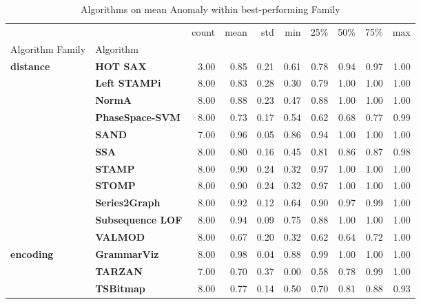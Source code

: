 \begin{table}
\caption{Algorithms on mean Anomaly within best-performing Family}
\label{tab:bp-mean}
\begin{tabular}{llrrrrrrrr}
\toprule
 &  & count & mean & std & min & 25\% & 50\% & 75\% & max \\
Algorithm Family & Algorithm &  &  &  &  &  &  &  &  \\
\midrule
\multirow[t]{11}{*}{\textbf{distance}} & \textbf{HOT SAX} & 3.00 & 0.85 & 0.21 & 0.61 & 0.78 & 0.94 & 0.97 & 1.00 \\
\textbf{} & \textbf{Left STAMPi} & 8.00 & 0.83 & 0.28 & 0.30 & 0.79 & 1.00 & 1.00 & 1.00 \\
\textbf{} & \textbf{NormA} & 8.00 & 0.88 & 0.23 & 0.47 & 0.88 & 1.00 & 1.00 & 1.00 \\
\textbf{} & \textbf{PhaseSpace-SVM} & 8.00 & 0.73 & 0.17 & 0.54 & 0.62 & 0.68 & 0.77 & 0.99 \\
\textbf{} & \textbf{SAND} & 7.00 & 0.96 & 0.05 & 0.86 & 0.94 & 1.00 & 1.00 & 1.00 \\
\textbf{} & \textbf{SSA} & 8.00 & 0.80 & 0.16 & 0.45 & 0.81 & 0.86 & 0.87 & 0.98 \\
\textbf{} & \textbf{STAMP} & 8.00 & 0.90 & 0.24 & 0.32 & 0.97 & 1.00 & 1.00 & 1.00 \\
\textbf{} & \textbf{STOMP} & 8.00 & 0.90 & 0.24 & 0.32 & 0.97 & 1.00 & 1.00 & 1.00 \\
\textbf{} & \textbf{Series2Graph} & 8.00 & 0.92 & 0.12 & 0.64 & 0.90 & 0.97 & 0.99 & 1.00 \\
\textbf{} & \textbf{Subsequence LOF} & 8.00 & 0.94 & 0.09 & 0.75 & 0.88 & 1.00 & 1.00 & 1.00 \\
\textbf{} & \textbf{VALMOD} & 8.00 & 0.67 & 0.20 & 0.32 & 0.62 & 0.64 & 0.72 & 1.00 \\
\cline{1-10}
\multirow[t]{3}{*}{\textbf{encoding}} & \textbf{GrammarViz} & 8.00 & 0.98 & 0.04 & 0.88 & 0.99 & 1.00 & 1.00 & 1.00 \\
\textbf{} & \textbf{TARZAN} & 7.00 & 0.70 & 0.37 & 0.00 & 0.58 & 0.78 & 0.99 & 1.00 \\
\textbf{} & \textbf{TSBitmap} & 8.00 & 0.77 & 0.14 & 0.50 & 0.70 & 0.81 & 0.88 & 0.93 \\
\cline{1-10}
\bottomrule
\end{tabular}
\end{table}
